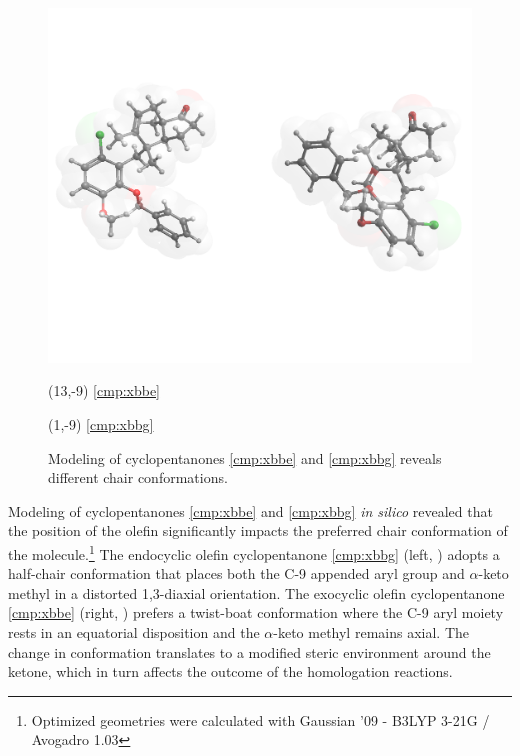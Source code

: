  \begin{figure}[h]
  \centering
  \vspace{-60pt}
  \includegraphics[scale=0.30]{chp_singlecarbon/images/homotwomodel}
  \vspace{-75pt}
   \begin{textblock}{1}(13,-9) \textsf{\scriptsize{\ref{cmp:xbbe}}} \end{textblock}
   \begin{textblock}{1}(1,-9) \textsf{\scriptsize{\ref{cmp:xbbg}}} \end{textblock}
  \caption{Modeling of cyclopentanones \ref{cmp:xbbe} and \ref{cmp:xbbg} reveals different chair 
  conformations.}
  \label{fig:homotwomodel}
\end{figure}
Modeling of cyclopentanones \ref{cmp:xbbe} and \ref{cmp:xbbg} \textit{in silico} revealed that the
position of the olefin significantly impacts the preferred chair conformation of the
molecule.\footnote{Optimized geometries were calculated with Gaussian '09 - B3LYP 3-21G / Avogadro
1.03} The endocyclic olefin cyclopentanone \ref{cmp:xbbg} (left, ) adopts a
half-chair conformation that places both the C-9 appended aryl group and $\alpha$-keto methyl in a
distorted 1,3-diaxial orientation. The exocyclic olefin cyclopentanone \ref{cmp:xbbe} (right,
) prefers a twist-boat conformation where the C-9 aryl moiety rests in an
equatorial disposition and the $\alpha$-keto methyl remains axial. The change in conformation
translates to a modified steric environment around the ketone, which in turn affects the outcome
of the homologation reactions. 



